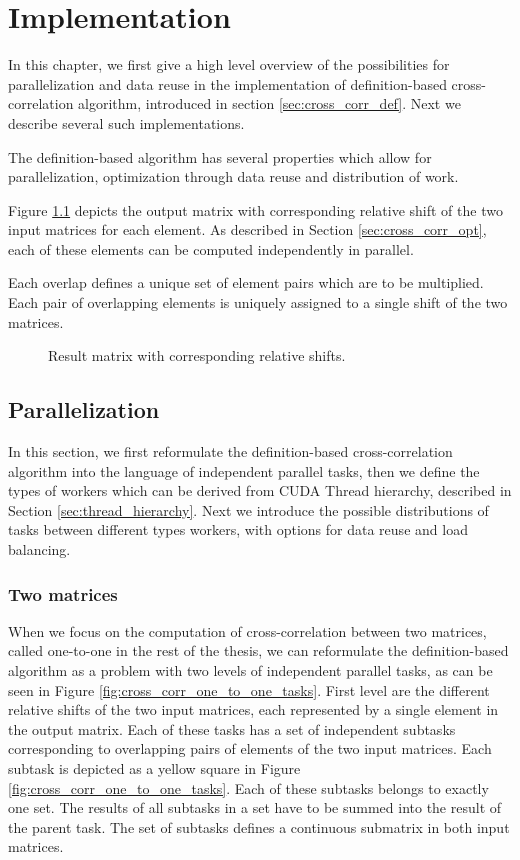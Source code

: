 \chapter{Implementation}

In this chapter, we first give a high level overview of the possibilities for parallelization and data reuse in the implementation of definition-based cross-correlation algorithm, introduced in section \ref{sec:cross_corr_def}. Next we describe several such implementations.


The definition-based algorithm has several properties which allow for parallelization, optimization through data reuse and distribution of work.

Figure \ref{fig:cross_corr_shifts} depicts the output matrix with corresponding relative shift of the two input matrices for each element. As described in Section \ref{sec:cross_corr_opt}, each of these elements can be computed independently in parallel.

Each overlap defines a unique set of element pairs which are to be multiplied. Each pair of overlapping elements is uniquely assigned to a single shift of the two matrices. 

\begin{figure}[h]
	\centering
	\def\svgwidth{\textwidth}
	
	\caption{Result matrix with corresponding relative shifts.}
	\label{fig:cross_corr_shifts}
\end{figure}


\section{Parallelization}
In this section, we first reformulate the definition-based cross-correlation algorithm into the language of independent parallel tasks, then we define the types of workers which can be derived from CUDA Thread hierarchy, described in Section \ref{sec:thread_hierarchy}. Next we introduce the possible distributions of tasks between different types workers, with options for data reuse and load balancing.

\subsection{Two matrices}
When we focus on the computation of cross-correlation between two matrices, called one-to-one in the rest of the thesis, we can reformulate the definition-based algorithm as a problem with two levels of independent parallel tasks, as can be seen in Figure \ref{fig:cross_corr_one_to_one_tasks}. First level are the different relative shifts of the two input matrices, each represented by a single element in the output matrix. Each of these tasks has a set of independent subtasks corresponding to overlapping pairs of elements of the two input matrices. Each subtask is depicted as a yellow square in Figure \ref{fig:cross_corr_one_to_one_tasks}. Each of these subtasks belongs to exactly one set. The results of all subtasks in a set have to be summed into the result of the parent task. The set of subtasks defines a continuous submatrix in both input matrices.

